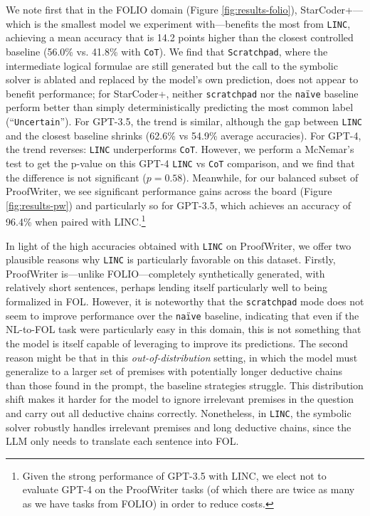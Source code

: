 \documentclass[11pt]{article}
\begin{document}
We note first that in the FOLIO domain (Figure \ref{fig:results-folio}), StarCoder+---which is the smallest model we experiment with---benefits the most from \texttt{LINC}, achieving a mean accuracy that is 14.2 points higher than the closest controlled baseline (56.0\% vs. 41.8\% with \texttt{CoT}).
We find that \texttt{Scratchpad}, where the intermediate logical formulae are still generated but the call to the symbolic solver is ablated and replaced by the model's own prediction, does not appear to benefit performance; for StarCoder+, neither \texttt{scratchpad} nor the \texttt{na\"ive} baseline perform better than simply deterministically predicting the most common label (``\texttt{Uncertain}'').
For GPT-3.5, the trend is similar, although the gap between \texttt{LINC} and the closest baseline shrinks (62.6\% vs 54.9\% average accuracies).
For GPT-4, the trend reverses: \texttt{LINC} underperforms \texttt{CoT}. However, we perform a McNemar's test to get the p-value on this GPT-4 \texttt{LINC} vs \texttt{CoT} comparison, and we find that the difference is not significant ($p=0.58$). Meanwhile, for our balanced subset of ProofWriter, we see significant performance gains across the board (Figure \ref{fig:results-pw}) and particularly so for GPT-3.5, which achieves an accuracy of 96.4\% when paired with LINC.\footnote{Given the strong performance of GPT-3.5 with LINC, we elect not to evaluate GPT-4 on the ProofWriter tasks (of which there are twice as many as we have tasks from FOLIO) in order to reduce costs.}

In light of the high accuracies obtained with \texttt{LINC} on ProofWriter, we offer two plausible reasons why \texttt{LINC} is particularly favorable on this dataset.
Firstly, ProofWriter is---unlike FOLIO---completely synthetically generated, with relatively short sentences, perhaps lending itself particularly well to being formalized in FOL.
However, it is noteworthy that the \texttt{scratchpad} mode does not seem to improve performance over the \texttt{na\"ive} baseline, indicating that even if the NL-to-FOL task were particularly easy in this domain, this is not something that the model is itself capable of leveraging to improve its predictions.
The second reason might be that in this \emph{out-of-distribution} setting, in which the model must generalize to a larger set of premises with potentially longer deductive chains than those found in the prompt, the baseline strategies struggle. This distribution shift makes it harder for the model to ignore irrelevant premises in the question and carry out all deductive chains correctly.
Nonetheless, in \texttt{LINC}, the symbolic solver robustly handles irrelevant premises and long deductive chains, since the LLM only needs to translate each sentence into FOL.
\end{document}
